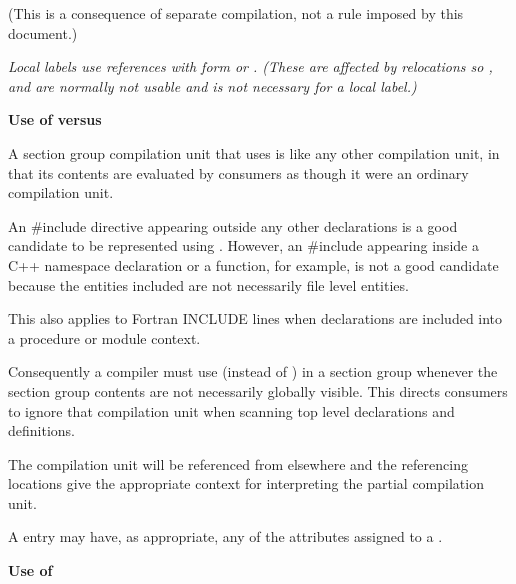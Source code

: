 (This is a consequence of separate compilation, not a rule
imposed by this document.)

\textit{Local labels use references with form 
or 
. 
(These are affected by relocations
so 
, 
 and 
 are
normally not usable and 
 is not necessary
for a local label.)}

\textbf{Use of  versus 
}

A section group compilation unit that uses 
is like any other compilation unit, in that its contents
are evaluated by consumers as though it were an ordinary
compilation unit.

An \#include directive appearing outside any other
declarations is a good candidate to be represented using
. 
However, an \#include appearing inside
a C++ namespace declaration or a function, for example, is
not a good candidate because the entities included are not
necessarily file level entities.

This also applies to Fortran INCLUDE lines when declarations
are included into a procedure or module context.

Consequently a compiler must use  (instead
of ) in a section group whenever the section
group contents are not necessarily globally visible. This
directs consumers to ignore that compilation unit when scanning
top level declarations and definitions.

The  compilation unit will be referenced
from elsewhere and the referencing locations give the
appropriate context for interpreting the partial compilation
unit.

A  entry may have, as appropriate, any of
the attributes assigned to a .


\textbf{Use of }

